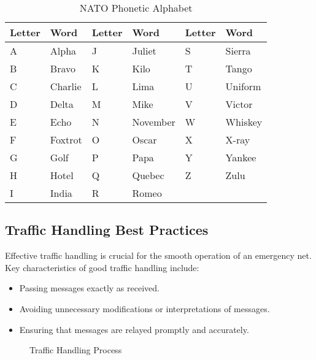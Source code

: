 \begin{table}[h]
    \centering
    \caption{NATO Phonetic Alphabet}
    \label{tab:phonetic_alphabet}
    \begin{tabular}{|l|l||l|l||l|l|}
        \hline
        \textbf{Letter} & \textbf{Word} & \textbf{Letter} & \textbf{Word} & \textbf{Letter} & \textbf{Word} \\
        \hline
        A & Alpha & J & Juliet & S & Sierra \\
        B & Bravo & K & Kilo & T & Tango \\
        C & Charlie & L & Lima & U & Uniform \\
        D & Delta & M & Mike & V & Victor \\
        E & Echo & N & November & W & Whiskey \\
        F & Foxtrot & O & Oscar & X & X-ray \\
        G & Golf & P & Papa & Y & Yankee \\
        H & Hotel & Q & Quebec & Z & Zulu \\
        I & India & R & Romeo & & \\
        \hline
    \end{tabular}
\end{table}

\subsection*{Traffic Handling Best Practices}
Effective traffic handling is crucial for the smooth operation of an emergency net. Key characteristics of good traffic handling include:
\begin{itemize}
    \item Passing messages exactly as received.
    \item Avoiding unnecessary modifications or interpretations of messages.
    \item Ensuring that messages are relayed promptly and accurately.
\end{itemize}

\begin{figure}[h]
    \centering
    \caption{Traffic Handling Process}
    \label{fig:traffic_handling}
\end{figure}


